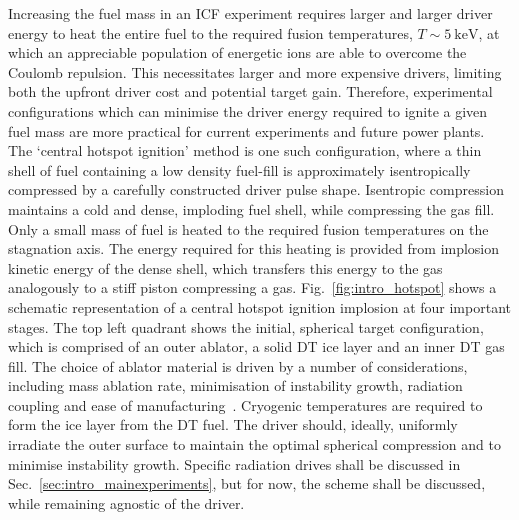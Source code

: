 Increasing the fuel mass in an \ac{ICF} experiment requires larger and larger driver energy to heat the entire fuel to the required fusion temperatures, $T\sim5\ \text{keV}$, at which an appreciable population of energetic ions are able to overcome the Coulomb repulsion.
This necessitates larger and more expensive drivers, limiting both the upfront driver cost and potential target gain.
Therefore, experimental configurations which can minimise the driver energy required to ignite a given fuel mass are more practical for current experiments and future power plants.
The `central hotspot ignition' method is one such configuration, where a thin shell of fuel containing a low density fuel-fill is approximately isentropically compressed by a carefully constructed driver pulse shape.
Isentropic compression maintains a cold and dense, imploding fuel shell, while compressing the gas fill.
Only a small mass of fuel is heated to the required fusion temperatures on the stagnation axis.
The energy required for this heating is provided from implosion kinetic energy of the dense shell, which transfers this energy to the gas analogously to a stiff piston compressing a gas.
Fig.~\ref{fig:intro_hotspot} shows a schematic representation of a central hotspot ignition implosion at four important stages.
The top left quadrant shows the initial, spherical target configuration, which is comprised of an outer ablator, a solid DT ice layer and an inner DT gas fill.
The choice of ablator material is driven by a number of considerations, including mass ablation rate, minimisation of instability growth, radiation coupling and ease of manufacturing~\cite{lafon_directdriveignition_2015,kline_first_2016,hu_laserdirectdrive_2023,casey_performance_2015}.
Cryogenic temperatures are required to form the ice layer from the DT fuel.
The driver should, ideally, uniformly irradiate the outer surface to maintain the optimal spherical compression and to minimise instability growth.
Specific radiation drives shall be discussed in Sec.~\ref{sec:intro_mainexperiments}, but for now, the scheme shall be discussed, while remaining agnostic of the driver.

